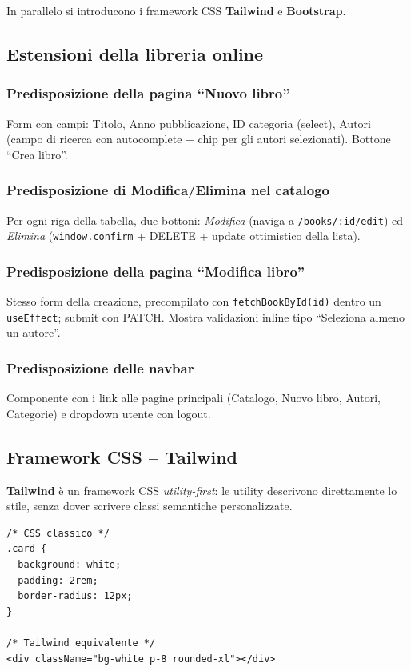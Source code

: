 \documentclass[11pt,a4paper]{article}
\begin{document}
In parallelo si introducono i framework CSS \textbf{Tailwind} e \textbf{Bootstrap}.

\subsection{Estensioni della libreria online}

\subsubsection{Predisposizione della pagina ``Nuovo libro''}
Form con campi: Titolo, Anno pubblicazione, ID categoria (select), Autori (campo di ricerca con autocomplete + chip per gli autori selezionati). Bottone ``Crea libro''.

\subsubsection{Predisposizione di Modifica/Elimina nel catalogo}
Per ogni riga della tabella, due bottoni: \emph{Modifica} (naviga a \texttt{/books/:id/edit}) ed \emph{Elimina} (\texttt{window.confirm} + DELETE + update ottimistico della lista).

\subsubsection{Predisposizione della pagina ``Modifica libro''}
Stesso form della creazione, precompilato con \texttt{fetchBookById(id)} dentro un \texttt{useEffect}; submit con PATCH. Mostra validazioni inline tipo ``Seleziona almeno un autore''.

\subsubsection{Predisposizione delle navbar}
Componente con i link alle pagine principali (Catalogo, Nuovo libro, Autori, Categorie) e dropdown utente con logout.

\subsection{Framework CSS -- Tailwind}

\textbf{Tailwind} \`e un framework CSS \emph{utility-first}: le utility descrivono direttamente lo stile, senza dover scrivere classi semantiche personalizzate.

\begin{lstlisting}[language=tsx]
/* CSS classico */
.card {
  background: white;
  padding: 2rem;
  border-radius: 12px;
}

/* Tailwind equivalente */
<div className="bg-white p-8 rounded-xl"></div>
\end{lstlisting}
\end{document}
